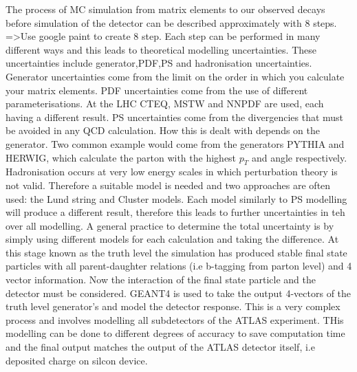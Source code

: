 The process of MC simulation from matrix elements to our observed decays before simulation of the detector can be described approximately with 8 steps.
=>Use google paint to create 8 step.
Each step can be performed in many different ways and this leads to theoretical modelling uncertainties. These uncertainties include generator,PDF,PS and hadronisation uncertainties. 
Generator uncertainties come from the limit on the order in which you calculate your matrix elements. PDF uncertainties come from the use of different parameterisations. At the LHC CTEQ, MSTW and NNPDF are used, each having a different result. PS uncertainties come from the divergencies that must be avoided in any QCD calculation. How this is dealt with depends on the generator. Two common example would come from the generators PYTHIA and HERWIG, which calculate the parton with the highest $p_T$ and angle respectively. Hadronisation occurs at very low energy scales in which perturbation theory is not valid. Therefore a suitable model is needed and two approaches are often used: the Lund string and Cluster models. Each model similarly to PS modelling will produce a different result, therefore this leads to further uncertainties in teh over all modelling. 
A general practice to determine the total uncertainty is by simply using different models for each calculation and taking the difference. 
At this stage known as the truth level the simulation has produced stable final state particles with all parent-daughter relations (i.e b-tagging from parton level) and 4 vector information. Now the interaction of the final state particle and the detector must be considered.       
GEANT4 is used to take the output 4-vectors of the truth level generator's and model the detector response. This is a very complex process and involves modelling all subdetectors of the ATLAS experiment. THis modelling can be done to different degrees of accuracy to save computation time and the final output matches the output of the ATLAS detector itself, i.e deposited charge on silcon device.   
